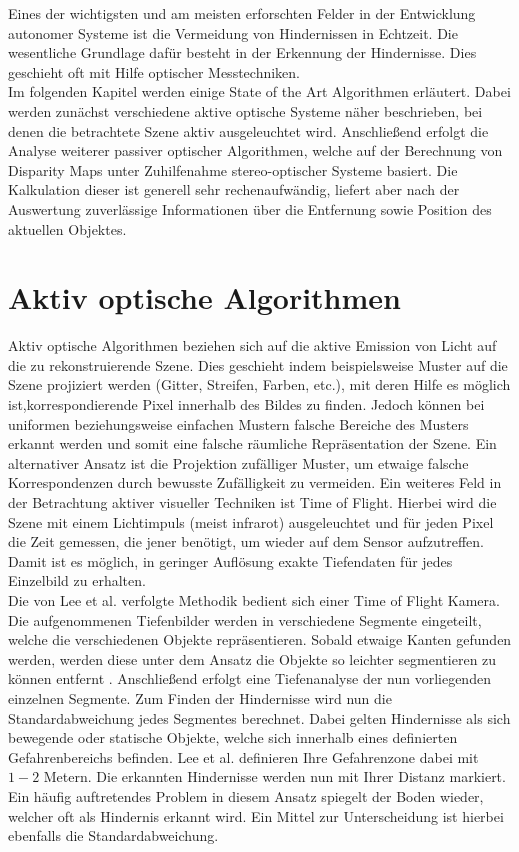 Eines der wichtigsten und am meisten erforschten Felder in der Entwicklung autonomer Systeme ist die Vermeidung von Hindernissen in Echtzeit. Die wesentliche Grundlage dafür besteht in der Erkennung der Hindernisse. Dies geschieht oft mit Hilfe optischer Messtechniken.\\

Im folgenden Kapitel werden einige State of the Art Algorithmen erläutert. Dabei werden zunächst verschiedene aktive optische Systeme näher beschrieben, bei denen die betrachtete Szene aktiv ausgeleuchtet wird. Anschließend erfolgt die Analyse weiterer passiver optischer Algorithmen, welche auf der Berechnung von Disparity Maps unter Zuhilfenahme stereo-optischer Systeme basiert. Die Kalkulation dieser ist generell sehr rechenaufwändig, liefert aber nach der Auswertung zuverlässige Informationen über die Entfernung sowie Position des aktuellen Objektes.

\section{Aktiv optische Algorithmen}
\label{sec:kamera_basierte_he}
Aktiv optische Algorithmen beziehen sich auf die aktive Emission von Licht auf die zu rekonstruierende Szene. Dies geschieht indem beispielsweise Muster auf die Szene projiziert werden (Gitter, Streifen, Farben, etc.), mit deren Hilfe es möglich ist,korrespondierende Pixel innerhalb des Bildes zu finden. Jedoch können bei uniformen beziehungsweise einfachen Mustern falsche Bereiche des Musters erkannt werden und somit eine falsche räumliche Repräsentation der Szene. Ein alternativer Ansatz ist die Projektion zufälliger Muster, um etwaige falsche Korrespondenzen durch bewusste Zufälligkeit zu vermeiden. Ein weiteres Feld in der Betrachtung aktiver visueller Techniken ist Time of Flight. Hierbei wird die Szene mit einem Lichtimpuls (meist infrarot) ausgeleuchtet und für jeden Pixel die Zeit gemessen, die jener benötigt, um wieder auf dem Sensor aufzutreffen. Damit ist es möglich, in geringer Auflösung exakte Tiefendaten für jedes Einzelbild zu erhalten.\\

\noindent
Die von Lee et al. \cite{lee2012intelligent} verfolgte Methodik bedient sich einer Time of Flight Kamera. Die aufgenommenen Tiefenbilder werden in verschiedene Segmente eingeteilt, welche die verschiedenen Objekte repräsentieren. Sobald etwaige Kanten gefunden werden, werden diese unter dem Ansatz die Objekte so leichter segmentieren zu können entfernt . Anschließend erfolgt eine Tiefenanalyse der nun vorliegenden einzelnen Segmente. Zum Finden der Hindernisse wird nun die Standardabweichung jedes Segmentes berechnet.
Dabei gelten Hindernisse als sich bewegende oder statische Objekte, welche sich innerhalb eines definierten Gefahrenbereichs befinden. Lee et al. definieren Ihre Gefahrenzone dabei mit $1-2$ Metern. Die erkannten Hindernisse werden nun mit Ihrer Distanz markiert. Ein häufig auftretendes Problem in diesem Ansatz spiegelt der Boden wieder, welcher oft als Hindernis erkannt wird. Ein Mittel zur Unterscheidung ist hierbei ebenfalls die Standardabweichung.

